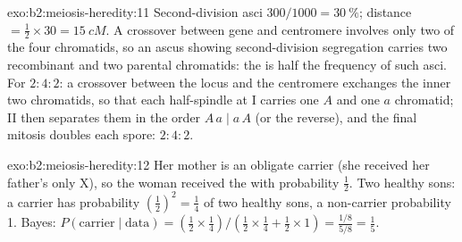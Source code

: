 \begin{solution}{exo:b2:meiosis-heredity:11}
Second-division asci $300/1000 = \qty{30}{\%}$; distance $=
\tfrac12\times 30 = \qty{15}{cM}$. A crossover between gene and
centromere involves only two of the four chromatids, so an ascus
showing second-division segregation carries two recombinant and two
parental chromatids: the  is half the
frequency of such asci. For $2 : 4 : 2$: a crossover between the
locus and the centromere exchanges the inner two chromatids, so
that each half-spindle at  I carries one $A$ and one $a$
chromatid;  II then separates them in the order $A\,a \mid
a\,A$ (or the reverse), and the final mitosis doubles each spore:
$2 : 4 : 2$.
\end{solution}

\begin{solution}{exo:b2:meiosis-heredity:12}
Her mother is an obligate carrier (she received her father's only
X), so the woman received the  with probability $\tfrac12$.
Two healthy sons: a carrier has probability $(\tfrac12)^2 = \tfrac14$
of two healthy sons, a non-carrier probability 1. Bayes:
$P(\text{carrier}\mid\text{data}) = (\tfrac12\times\tfrac14)/(\tfrac12
\times\tfrac14 + \tfrac12\times 1) = \tfrac{1/8}{5/8} = \tfrac15$.
\end{solution}

